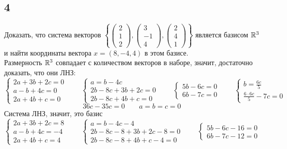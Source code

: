 \subsection{4}
Доказать, что система векторов $ \left\{
    \begin{pmatrix}
    	2 \\
        1 \\
        2
    \end{pmatrix},
    \begin{pmatrix}
    	3 \\
        -1 \\
        4
    \end{pmatrix},
    \begin{pmatrix}
    	2 \\
        4 \\
        1
    \end{pmatrix} \right\} $ является базисом $ \mathbb{R}^3 $ и найти координаты вектора $ x = (8, -4, 4) $ в этом базисе. \\
Размерность $ \mathbb{R}^3 $ совпадает с количеством векторов в наборе, значит, достаточно доказать, что они ЛНЗ:
$$
\begin{cases}
	2a + 3b + 2c = 0 \\
    a - b + 4c = 0 \\
    2a + 4b + c = 0
\end{cases} \qquad
\begin{cases}
	a = b - 4c \\
    2b - 8c + 3b + 2c = 0 \\
    2b - 8c + 4b + c = 0
\end{cases} \qquad
\begin{cases}
	5b - 6c = 0 \\
    6b - 7c = 0
\end{cases} \qquad
\begin{cases}
    b = \frac{6c}5 \\
    \frac{6 \cdot 6c}5 - 7c = 0
\end{cases} $$
$$ 36c - 35c = 0 \qquad a = b = c = 0 $$
Система ЛНЗ, значит, это базис
$$
\begin{cases}
	2a + 3b + 2c = 8 \\
    a - b + 4c = -4 \\
    2a + 4b + c = 4
\end{cases} \qquad
\begin{cases}
	a = b - 4c - 4 \\
    2b - 8c - 8 + 3b + 2c - 8 = 0 \\
    2b - 8c - 8 + 4b + c - 4 = 0
\end{cases} \qquad
\begin{cases}
	5b - 6c - 16 = 0 \\
    6b - 7c - 12 = 0
\end{cases} $$
